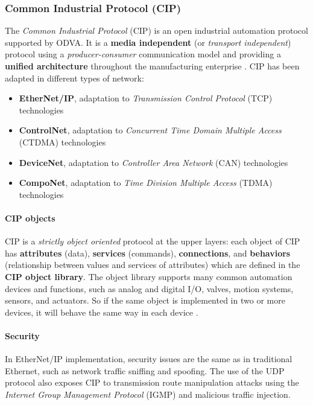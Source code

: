 \subsubsection{Common Industrial Protocol (CIP)}
\label{subsubsec:cip}
The \textit{Common Industrial Protocol} (CIP) is an open industrial automation protocol supported by ODVA. It is a \textbf{media independent} (or \textit{transport independent}) protocol using a \textit{producer-consumer} communication model and providing a \textbf{unified architecture} throughout the manufacturing enterprise \cite{cip_protocol_web}\cite{cip_wiki}.\newline
CIP has been adapted in different types of network:

\begin{itemize}
	\item \textbf{EtherNet/IP}, adaptation to \textit{Transmission Control Protocol} (TCP) technologies
	
	\item \textbf{ControlNet}, adaptation to \textit{Concurrent Time Domain Multiple Access} (CTDMA) technologies
	
	\item \textbf{DeviceNet}, adaptation to \textit{Controller Area Network} (CAN) technologies
	
	\item \textbf{CompoNet}, adaptation to \textit{Time Division Multiple Access} (TDMA) technologies
\end{itemize}

\bigskip
\paragraph{CIP objects} CIP is a \textit{strictly object oriented} protocol at the upper layers: each object of CIP has \textbf{attributes} (data), \textbf{services} (commands), \textbf{connections}, and \textbf{behaviors} (relationship between values and services of attributes) which are defined in the \textbf{CIP object library}. The object library supports many common automation devices and functions, such as analog and digital I/O, valves, motion systems, sensors, and actuators. So if the same object is implemented in two or more devices, it will behave the same way in each device \cite{cip_objects}.

\paragraph{Security}\cite{cip_security} In EtherNet/IP implementation, security issues are the same as in traditional Ethernet, such as network traffic sniffing and spoofing. The use of the UDP protocol also exposes CIP to transmission route manipulation attacks using the \textit{Internet Group Management Protocol} (IGMP) and malicious traffic injection.

